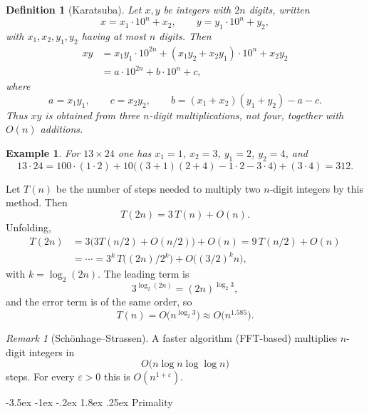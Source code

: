 \documentclass[11pt]{article}
\makeatletter
\renewcommand{\subsection}{\@startsection{subsection}{2}{\z@}%
    {-3.5ex \@plus -1ex \@minus -.2ex}%
    {1.8ex \@plus .25ex}%
    {\normalfont\large\bfseries}}
\newtheorem{definition}[theorem]{Definition}
\newtheorem{example}[theorem]{Example}
\theoremstyle{remark}
\newtheorem*{remark}{Remark}
\makeatother
\begin{document}
\begin{definition}[Karatsuba]
Let $x,y$ be integers with $2n$ digits, written
\[
    x = x_1\cdot 10^n + x_2,
    \qquad
    y = y_1\cdot 10^n + y_2,
\]
with $x_1,x_2,y_1,y_2$ having at most $n$ digits. Then
\begin{align*}
    xy
    &=
    x_1 y_1 \cdot 10^{2n}
    +
    (x_1 y_2 + x_2 y_1)\cdot 10^n
    +
    x_2 y_2 \\
    &=
    a\cdot 10^{2n} + b\cdot 10^n + c,
\end{align*}
where
\[
    a=x_1 y_1,
    \qquad
    c=x_2 y_2,
    \qquad
    b
    =
    (x_1+x_2)(y_1+y_2) - a - c.
\]
Thus $xy$ is obtained from \emph{three} $n$-digit multiplications, not
four, together with $O(n)$ additions.
\end{definition}

\begin{example}
For $13\times 24$ one has $x_1=1$, $x_2=3$, $y_1=2$, $y_2=4$, and
\[
    13\cdot 24
    =
    100\cdot(1\cdot 2)
    +
    10\bigl((3+1)(2+4)-1\cdot 2-3\cdot 4\bigr)
    +
    (3\cdot 4)
    =
    312.
\]
\end{example}

Let $T(n)$ be the number of steps needed to multiply two $n$-digit
integers by this method. Then
\[
    T(2n) = 3\, T(n) + O(n).
\]
Unfolding,
\begin{align*}
    T(2n)
    &=
    3\bigl(3T(n/2)+O(n/2)\bigr)+O(n)
    =
    9\, T(n/2) + O(n) \\
    &=
    \cdots
    =
    3^k\, T\bigl((2n)/2^k\bigr)
    +
    O\bigl((3/2)^k n\bigr),
\end{align*}
with $k=\log_2(2n)$. The leading term is
\[
    3^{\log_2(2n)}
    =
    (2n)^{\log_2 3},
\]
and the error term is of the same order, so
\[
    T(n) = O\bigl(n^{\log_2 3}\bigr)
    \approx
    O\bigl(n^{1.585}\bigr).
\]

\begin{remark}[Sch\"onhage--Strassen]
A faster algorithm (FFT-based) multiplies $n$-digit integers in
\[
    O\bigl(n\log n\log\log n\bigr)
\]
steps. For every $\varepsilon>0$ this is $O(n^{1+\varepsilon})$.
\end{remark}

\subsection{Primality}
\end{document}
